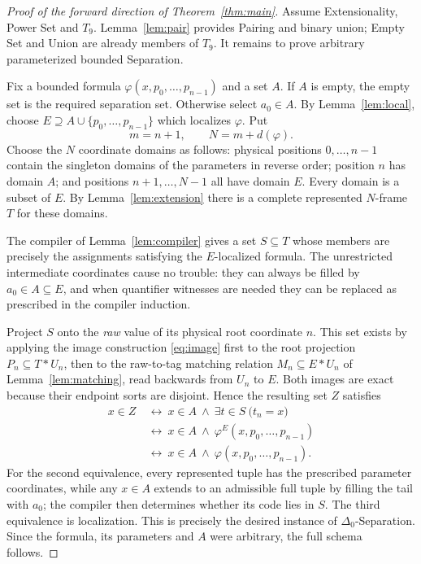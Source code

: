 \documentclass[11pt,a4paper]{article}
\numberwithin{equation}{section}
\newcommand{\UnProd}{\mathbin{\ast}}
\newcommand{\Dzero}{\Delta_0}
\newcommand{\Tnine}{T_9}
\begin{document}
\begin{proof}[Proof of the forward direction of Theorem~\ref{thm:main}]
Assume Extensionality, Power Set and $\Tnine$.  Lemma~\ref{lem:pair} provides Pairing and binary union; Empty Set and Union are already members of $\Tnine$.  It remains to prove arbitrary parameterized bounded Separation.

Fix a bounded formula $\varphi(x,p_0,\ldots,p_{n-1})$ and a set $A$.  If $A$ is empty, the empty set is the required separation set.  Otherwise select $a_0\in A$.  By Lemma~\ref{lem:local}, choose $E\supseteq A\cup\{p_0,\ldots,p_{n-1}\}$ which localizes $\varphi$.  Put
\[
m=n+1,\qquad N=m+d(\varphi).
\]
Choose the $N$ coordinate domains as follows: physical positions $0,\ldots,n-1$ contain the singleton domains of the parameters in reverse order; position $n$ has domain $A$; and positions $n+1,\ldots,N-1$ all have domain $E$.  Every domain is a subset of $E$.  By Lemma~\ref{lem:extension} there is a complete represented $N$-frame $T$ for these domains.

The compiler of Lemma~\ref{lem:compiler} gives a set $S\subseteq T$ whose members are precisely the assignments satisfying the $E$-localized formula.  The unrestricted intermediate coordinates cause no trouble: they can always be filled by $a_0\in A\subseteq E$, and when quantifier witnesses are needed they can be replaced as prescribed in the compiler induction.

Project $S$ onto the \emph{raw} value of its physical root coordinate $n$.  This set exists by applying the image construction \eqref{eq:image} first to the root projection $P_n\subseteq T\UnProd U_n$, then to the raw-to-tag matching relation $M_n\subseteq E\UnProd U_n$ of Lemma~\ref{lem:matching}, read backwards from $U_n$ to $E$.  Both images are exact because their endpoint sorts are disjoint.  Hence the resulting set $Z$ satisfies
\[
\begin{aligned}
x\in Z
&\ \longleftrightarrow\ x\in A\ \land\
\exists t\in S\ \bigl(t_n=x\bigr)\\
&\ \longleftrightarrow\ x\in A\ \land\
\varphi^E(x,p_0,\ldots,p_{n-1})\\
&\ \longleftrightarrow\ x\in A\ \land\
\varphi(x,p_0,\ldots,p_{n-1}).
\end{aligned}
\]
For the second equivalence, every represented tuple has the prescribed parameter coordinates, while any $x\in A$ extends to an admissible full tuple by filling the tail with $a_0$; the compiler then determines whether its code lies in $S$.  The third equivalence is localization.  This is precisely the desired instance of $\Dzero$-Separation.  Since the formula, its parameters and $A$ were arbitrary, the full schema follows.
\end{proof}
\end{document}
